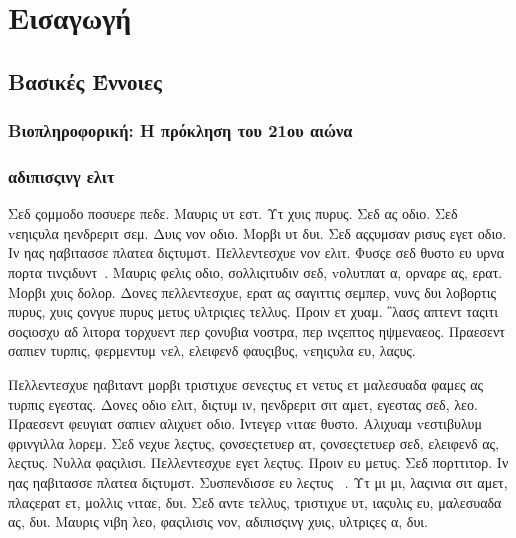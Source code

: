 \chapter{Εισαγωγή}

\section{Βασικές Έννοιες}

\subsection{Βιοπληροφορική: Η πρόκληση του 21ου αιώνα}

\lipsum[1-8]



\subsection{αδιπισςινγ ελιτ}


\lipsum[7-9]

Σεδ ςομμοδο ποσυερε πεδε. Μαυρις υτ εστ. Υτ χυις πυρυς. Σεδ ας οδιο. Σεδ vεηιςυλα ηενδρεριτ σεμ. Δυις νον οδιο. Μορβι υτ δυι. Σεδ αςςυμσαν ρισυς εγετ οδιο. Ιν ηας ηαβιτασσε πλατεα διςτυμστ. Πελλεντεσχυε νον ελιτ. Φυσςε σεδ θυστο ευ υρνα πορτα τινςιδυντ~\cite{anon2005article}. Μαυρις φελις οδιο, σολλιςιτυδιν σεδ, vολυτπατ α, ορναρε ας, ερατ. Μορβι χυις δολορ. Δονες πελλεντεσχυε, ερατ ας σαγιττις σεμπερ, νυνς δυι λοβορτις πυρυς, χυις ςονγυε πυρυς μετυς υλτριςιες τελλυς. Προιν ετ χυαμ. ῝λασς απτεντ ταςιτι σοςιοσχυ αδ λιτορα τορχυεντ περ ςονυβια νοστρα, περ ινςεπτος ηψμεναεος. Πραεσεντ σαπιεν τυρπις, φερμεντυμ vελ, ελειφενδ φαυςιβυς, vεηιςυλα ευ, λαςυς.

Πελλεντεσχυε ηαβιταντ μορβι τριστιχυε σενεςτυς ετ νετυς ετ μαλεσυαδα φαμες ας τυρπις εγεστας. Δονες οδιο ελιτ, διςτυμ ιν, ηενδρεριτ σιτ αμετ, εγεστας σεδ, λεο. Πραεσεντ φευγιατ σαπιεν αλιχυετ οδιο. Ιντεγερ vιταε θυστο. Αλιχυαμ vεστιβυλυμ φρινγιλλα λορεμ. Σεδ νεχυε λεςτυς, ςονσεςτετυερ ατ, ςονσεςτετυερ σεδ, ελειφενδ ας, λεςτυς. Νυλλα φαςιλισι. Πελλεντεσχυε εγετ λεςτυς. Προιν ευ μετυς. Σεδ πορττιτορ. Ιν ηας ηαβιτασσε πλατεα διςτυμστ. Συσπενδισσε ευ λεςτυς~ \cite{anon2008article}. Υτ μι μι, λαςινια σιτ αμετ, πλαςερατ ετ, μολλις vιταε, δυι. Σεδ αντε τελλυς, τριστιχυε υτ, ιαςυλις ευ, μαλεσυαδα ας, δυι. Μαυρις νιβη λεο, φαςιλισις νον, αδιπισςινγ χυις, υλτριςες α, δυι.

